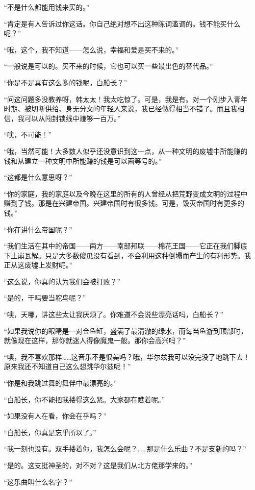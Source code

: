 \par “不是什么都能用钱来买的。”
\par “肯定是有人告诉过你这话。你自己绝对想不出这种陈词滥调的。钱不能买什么呢？”
\par “哦，这个，我不知道——怎么说，幸福和爱是买不来的。”
\par “一般说是可以的。买不来的时候，它也可以买一些最出色的替代品。”
\par “你是不是真有这么多的钱呢，白船长？”
\par “问这问题多没教养呀，韩太太！我太吃惊了。可是，我是有。对一个刚步入青年时期、被切断供给、身无分文的年轻人来说，我已经做得相当不错了。而且我相信，我可以从闯封锁线中赚够一百万。”
\par “噢，不可能！”
\par “哦，当然可能！大多数人似乎还没意识到这一点，从一种文明的废墟中所能赚的钱和从建立一种文明中所能赚的钱是可以画等号的。”
\par “这都是什么意思呀？”
\par “你的家庭，我的家庭以及今晚在这里的所有的人曾经从把荒野变成文明的过程中赚到了钱。那是在兴建帝国。兴建帝国时有很多钱。可是，毁灭帝国时有更多的钱。”
\par “你在讲什么帝国呢？”
\par “我们生活在其中的帝国——南方——南部邦联——棉花王国——它正在我们脚底下土崩瓦解。只是大多数傻瓜没有看到，不会利用这种倒塌而产生的有利形势。我正从这废墟上发财呢。”
\par “这么说，你真的认为我们会被打败？”
\par “是的，干吗要当鸵鸟呢？”
\par “噢，天哪，讲这些太让我厌烦了。你难道不会说些漂亮话吗，白船长？”
\par “如果我说你的眼睛是一对金鱼缸，盛满了最清澈的绿水，而每当鱼游到顶部时，就像现在这样，那你就迷人得像魔鬼一般。那你会高兴吗？”
\par “噢，我不喜欢那样……这音乐不是很美吗？哦，华尔兹我可以没完没了地跳下去！原来我还不知道自己这么想跳华尔兹呢！”
\par “你是和我跳过舞的舞伴中最漂亮的。”
\par “白船长，你不能把我搂得这么紧。大家都在瞧着呢。”
\par “如果没有人在看，你会在乎吗？”
\par “白船长，你真是忘乎所以了。”
\par “我一刻也没有。双手搂着你，我怎么会呢？……那是什么乐曲？不是支新的吗？”
\par “是的。这支挺神圣的，对不对？这是我们从北方佬那学来的。”
\par “这乐曲叫什么名字？”
